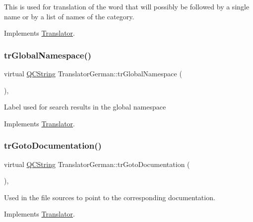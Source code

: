 This is used for translation of the word that will possibly be followed by a single name or by a list of names of the category. 

Implements \mbox{\hyperlink{class_translator}{Translator}}.

\mbox{\label{class_translator_german_ad47b2d87daf9478787ca318b26ad708a}} 
\subsubsection{\texorpdfstring{trGlobalNamespace()}{trGlobalNamespace()}}
{\footnotesize\ttfamily virtual \mbox{\hyperlink{class_q_c_string}{Q\+C\+String}} Translator\+German\+::tr\+Global\+Namespace (\begin{DoxyParamCaption}{ }\end{DoxyParamCaption})\hspace{0.3cm}{\ttfamily [inline]}, {\ttfamily [virtual]}}

Label used for search results in the global namespace 

Implements \mbox{\hyperlink{class_translator}{Translator}}.

\mbox{\label{class_translator_german_aac08568f84ad2f92009032ce2a555813}} 
\subsubsection{\texorpdfstring{trGotoDocumentation()}{trGotoDocumentation()}}
{\footnotesize\ttfamily virtual \mbox{\hyperlink{class_q_c_string}{Q\+C\+String}} Translator\+German\+::tr\+Goto\+Documentation (\begin{DoxyParamCaption}{ }\end{DoxyParamCaption})\hspace{0.3cm}{\ttfamily [inline]}, {\ttfamily [virtual]}}

Used in the file sources to point to the corresponding documentation. 

Implements \mbox{\hyperlink{class_translator}{Translator}}.

\mbox{\label{class_translator_german_acf3417276e26839993edfb654d4dce94}} 

